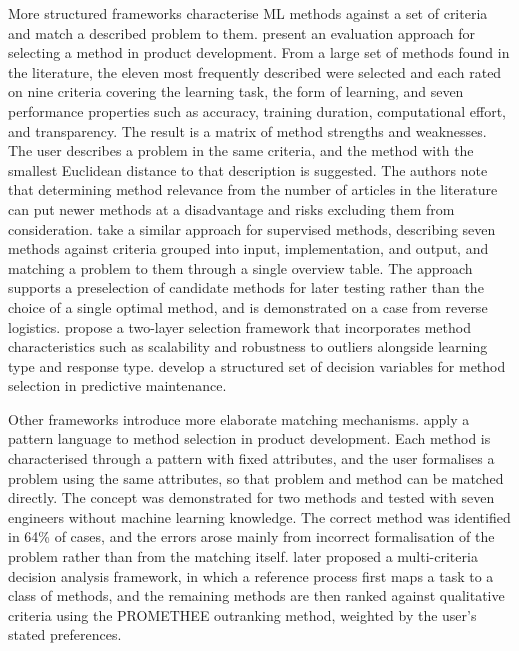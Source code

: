 More structured frameworks characterise ML methods against a set 
of criteria and match a described problem to them. 
\textcite{riesener2020} present an evaluation approach for 
selecting a method in product development. From a large set of 
methods found in the literature, the eleven most frequently 
described were selected and each rated on nine criteria 
covering the learning task, the form of learning, and seven 
performance properties such as accuracy, training duration, 
computational effort, and transparency. The result is a matrix 
of method strengths and weaknesses. The user describes a 
problem in the same criteria, and the method with the smallest 
Euclidean distance to that description is suggested. 
The authors note that determining method relevance from the number 
of articles in the literature can put newer methods at a 
disadvantage and risks excluding them from consideration.
\textcite{lickert2021_ml_selection_reverse_logistics} take a 
similar approach for supervised methods, describing seven 
methods against criteria grouped into input, implementation, 
and output, and matching a problem to them through a single 
overview table. The approach supports a preselection of 
candidate methods for later testing rather than the choice of 
a single optimal method, and is demonstrated on a case from 
reverse logistics. 
\textcite{sala2018selecting_ml_algorithm} propose a 
two-layer selection framework that incorporates method 
characteristics such as scalability and robustness to outliers 
alongside learning type and response type. 
\textcite{arena2024conceptual_framework_ml_algorithm_selection_predictive_maintenance} 
develop a structured set of decision variables for method 
selection in predictive maintenance.

Other frameworks introduce more elaborate matching mechanisms. 
\textcite{sonntag2023pattern_ml_product_development} apply a 
pattern language to method selection in product development. 
Each method is characterised through a pattern with fixed 
attributes, and the user formalises a problem using the same 
attributes, so that problem and method can be matched 
directly. The concept was demonstrated for two methods and 
tested with seven engineers without machine learning 
knowledge. The correct method was identified in 64\% of cases, 
and the errors arose mainly from incorrect formalisation of 
the problem rather than from the matching itself. 
\textcite{sonntag2024_mcda_framework} later proposed a 
multi-criteria decision analysis framework, in which a 
reference process first maps a task to a class of methods, and 
the remaining methods are then ranked against qualitative 
criteria using the PROMETHEE outranking method, weighted by 
the user's stated preferences.

